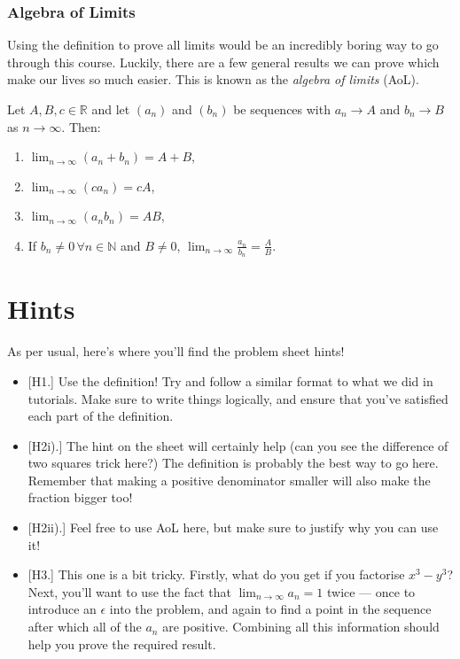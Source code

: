 \documentclass[
  17pt,
  a4paper]{extarticle}
\providecommand{\tightlist}{%
  \setlength{\itemsep}{0pt}\setlength{\parskip}{0pt}}
\theoremstyle{plain}
\theoremstyle{definition}
\theoremstyle{plain}
\theoremstyle{plain}
\theoremstyle{plain}
\theoremstyle{plain}
\theoremstyle{definition}
\theoremstyle{definition}
\theoremstyle{remark}
\theoremstyle{remark}
\let\BeginKnitrBlock\begin \let\EndKnitrBlock\end
\renewcommand{\;}{\,}
\begin{document}
\hypertarget{algebra-of-limits}{%
\subsubsection{Algebra of Limits}\label{algebra-of-limits}}

Using the definition to prove all limits would be an incredibly boring way to go through this course. Luckily, there are a few general results we can prove which make our lives so much easier. This is known as the \emph{algebra of limits} (AoL).

\BeginKnitrBlock{theorem}[Algebra of Limits]
{\label{thm:thm4} }Let \(A,B,c \in \mathbb{R}\) and let \((a_n)\) and \((b_n)\) be sequences with \(a_n \to A\) and \(b_n \to B\) as \(n \to \infty\). Then:

\begin{enumerate}
\def\labelenumi{\arabic{enumi}.}
\tightlist
\item
  \(\lim_{n \to \infty} (a_n + b_n) = A + B\),
\item
  \(\lim_{n \to \infty} (ca_n) = cA\),
\item
  \(\lim_{n \to \infty} (a_n b_n) = AB\),
\item
  If \(b_n \neq 0 \; \forall n \in \mathbb{N}\) and \(B \neq 0\), \(\lim_{n \to \infty} \frac{a_n}{b_n} = \frac{A}{B}\).
\end{enumerate}
\EndKnitrBlock{theorem}

\hypertarget{hints}{%
\section{Hints}\label{hints}}

As per usual, here's where you'll find the problem sheet hints!

\begin{itemize}
\tightlist
\item
  {[}H1.{]} Use the definition! Try and follow a similar format to what we did in tutorials. Make sure to write things logically, and ensure that you've satisfied each part of the definition.
\item
  {[}H2i).{]} The hint on the sheet will certainly help (can you see the difference of two squares trick here?) The definition is probably the best way to go here. Remember that making a positive denominator smaller will also make the fraction bigger too!
\item
  {[}H2ii).{]} Feel free to use AoL here, but make sure to justify why you can use it!
\item
  {[}H3.{]} This one is a bit tricky. Firstly, what do you get if you factorise \(x^3 - y^3\)? Next, you'll want to use the fact that \(\lim_{n \to \infty} a_n = 1\) twice --- once to introduce an \(\epsilon\) into the problem, and again to find a point in the sequence after which all of the \(a_n\) are positive. Combining all this information should help you prove the required result.
\end{itemize}
\end{document}
